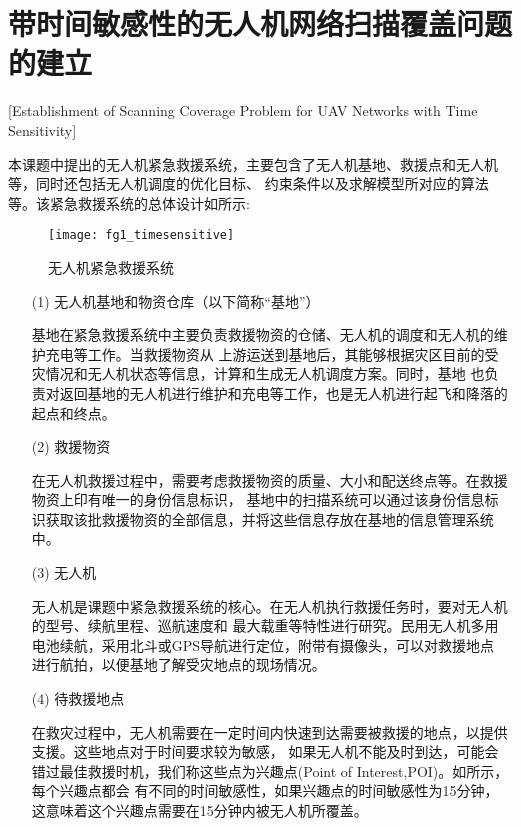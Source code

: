 \section{带时间敏感性的无人机网络扫描覆盖问题的建立}[Establishment of Scanning Coverage Problem for UAV Networks with Time Sensitivity]

本课题中提出的无人机紧急救援系统，主要包含了无人机基地、救援点和无人机等，同时还包括无人机调度的优化目标、
约束条件以及求解模型所对应的算法等。该紧急救援系统的总体设计如所示:

\begin{figure}[ht]
	\centering
	\texttt{[image: fg1\_timesensitive]}
	\caption{无人机紧急救援系统}
	\label{fg201}
\end{figure}

\begin{itemize}
	\item [(1)]  
	无人机基地和物资仓库（以下简称“基地”）


	\qquad 基地在紧急救援系统中主要负责救援物资的仓储、无人机的调度和无人机的维护充电等工作。当救援物资从
	上游运送到基地后，其能够根据灾区目前的受灾情况和无人机状态等信息，计算和生成无人机调度方案。同时，基地
	也负责对返回基地的无人机进行维护和充电等工作，也是无人机进行起飞和降落的起点和终点。

	\item[(2)]
	救援物资

	
	\qquad 在无人机救援过程中，需要考虑救援物资的质量、大小和配送终点等。在救援物资上印有唯一的身份信息标识，
	基地中的扫描系统可以通过该身份信息标识获取该批救援物资的全部信息，并将这些信息存放在基地的信息管理系统中。

	\item[(3)]
	无人机

	
	\qquad 无人机是课题中紧急救援系统的核心。在无人机执行救援任务时，要对无人机的型号、续航里程、巡航速度和
	最大载重等特性进行研究。民用无人机多用电池续航，采用北斗或GPS导航进行定位，附带有摄像头，可以对救援地点
	进行航拍，以便基地了解受灾地点的现场情况。

	\item[(4)]
	待救援地点


	\qquad 在救灾过程中，无人机需要在一定时间内快速到达需要被救援的地点，以提供支援。这些地点对于时间要求较为敏感，
	如果无人机不能及时到达，可能会错过最佳救援时机，我们称这些点为兴趣点(Point of Interest,POI)。如所示，每个兴趣点都会
	有不同的时间敏感性，如果兴趣点的时间敏感性为15分钟，这意味着这个兴趣点需要在15分钟内被无人机所覆盖。


\end{itemize}
